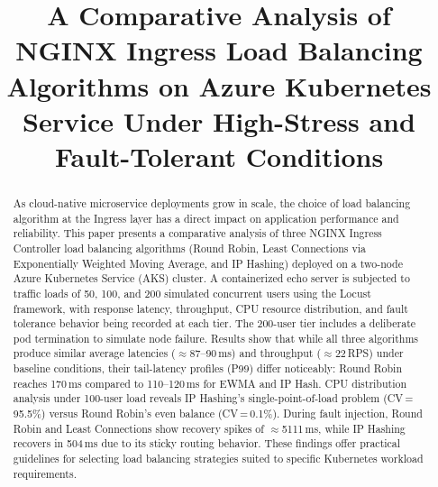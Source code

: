 \documentclass[conference]{IEEEtran}
\begin{document}
\title{A Comparative Analysis of NGINX Ingress Load Balancing Algorithms on Azure Kubernetes Service Under High-Stress and Fault-Tolerant Conditions}

\author{
}

\maketitle

\begin{abstract}
As cloud-native microservice deployments grow in scale, the choice of load balancing algorithm at the Ingress layer has a direct impact on application performance and reliability. This paper presents a comparative analysis of three NGINX Ingress Controller load balancing algorithms (Round Robin, Least Connections via Exponentially Weighted Moving Average, and IP Hashing) deployed on a two-node Azure Kubernetes Service (AKS) cluster. A containerized echo server is subjected to traffic loads of 50, 100, and 200 simulated concurrent users using the Locust framework, with response latency, throughput, CPU resource distribution, and fault tolerance behavior being recorded at each tier. The 200-user tier includes a deliberate pod termination to simulate node failure. Results show that while all three algorithms produce similar average latencies ($\approx$87--90\,ms) and throughput ($\approx$22\,RPS) under baseline conditions, their tail-latency profiles (P99) differ noticeably: Round Robin reaches 170\,ms compared to 110--120\,ms for EWMA and IP Hash. CPU distribution analysis under 100-user load reveals IP Hashing's single-point-of-load problem (CV\,=\,95.5\%) versus Round Robin's even balance (CV\,=\,0.1\%). During fault injection, Round Robin and Least Connections show recovery spikes of $\approx$5111\,ms, while IP Hashing recovers in 504\,ms due to its sticky routing behavior. These findings offer practical guidelines for selecting load balancing strategies suited to specific Kubernetes workload requirements.
\end{abstract}
\end{document}
